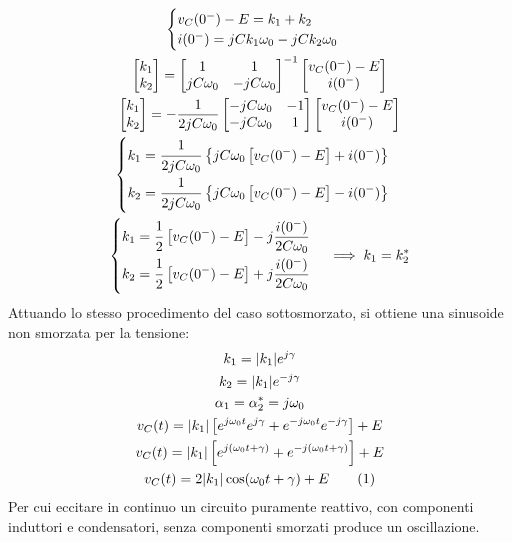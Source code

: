 \documentclass{article}
\newcommand{\tageq}{\tag{\stepcounter{equation}\theequation}}
\numberwithin{equation}{subsection}
\begin{document}
\begin{gather*}
    \begin{cases}
        v_C(0^-)-E=k_1+k_2\\
        i(0^-)=jCk_1\omega_0-jCk_2\omega_0
    \end{cases}\\
    \begin{bmatrix}
        k_1\\k_2
    \end{bmatrix}=
    \begin{bmatrix}
        1&1\\jC\omega_0&-jC\omega_0 
    \end{bmatrix}^{-1}
    \begin{bmatrix}
        v_C(0^-)-E\\i(0^-)
    \end{bmatrix}\\
    \begin{bmatrix}
        k_1\\k_2
    \end{bmatrix}=\displaystyle-\frac{1}{2jC\omega_0}
    \begin{bmatrix}
        -jC\omega_0&-1\\-jC\omega_0&1
    \end{bmatrix}
    \begin{bmatrix}
        v_C(0^-)-E\\i(0^-)
    \end{bmatrix}\\
    \begin{cases}
        k_1=\displaystyle\frac{\strut 1}{\strut 2jC\omega_0}\left\{jC\omega_0\left[v_C(0^-)-E\right]+i(0^-)\right\}\\
        k_2=\displaystyle\frac{\strut 1}{\strut 2jC\omega_0}\left\{jC\omega_0\left[v_C(0^-)-E\right]-i(0^-)\right\}
    \end{cases}\\
    \begin{cases}
        k_1=\displaystyle\frac{\strut 1}{\strut 2}\left[v_C(0^-)-E\right]-j\frac{i(0^-)}{2C\omega_0}\\
        k_2=\displaystyle\frac{1\strut }{\strut 2}\left[v_C(0^-)-E\right]+j\frac{i(0^-)}{2C\omega_0}
    \end{cases}\implies k_1=k_2^*
\end{gather*}
Attuando lo stesso procedimento del caso sottosmorzato, si ottiene una sinusoide non smorzata per la tensione:
\begin{gather*}
    k_1=|k_1|e^{j\gamma}\\
    k_2=|k_1|e^{-j\gamma}\\
    \alpha_1=\alpha_2^*=j\omega_0\\
    v_C(t)=|k_1|\left[e^{j\omega_0t}e^{j\gamma}+e^{-j\omega_0t}e^{-j\gamma}\right]+E\\
    v_C(t)=|k_1|\left[e^{j(\omega_0t+\gamma)}+e^{-j(\omega_0t+\gamma)}\right]+E\\
    v_C(t)=2|k_1|\cos(\omega_0t+\gamma)+E\tageq
\end{gather*}
Per cui eccitare in continuo un circuito puramente reattivo, con componenti induttori e condensatori, senza componenti smorzati produce un oscillazione. 
\end{document}
